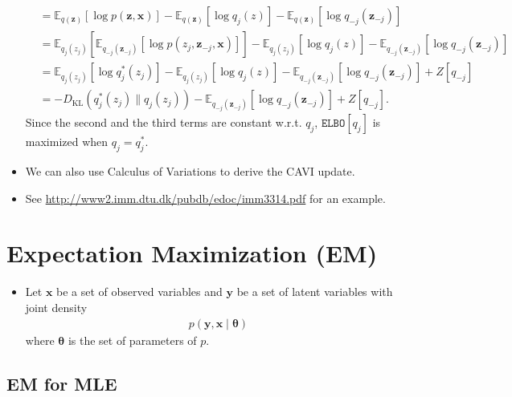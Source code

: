 \documentclass[10pt]{article}
\newcommand{\EE}{\mathbb{E}}
\newcommand{\elbo}{\texttt{ELBO}}
\newcommand{\KL}{D_{\text{KL}}}
\begin{document}
\begin{itemize}
\begin{align*}
&= \EE_{q(\bm{z})} [ \log p(\bm{z},\bm{x}) ] - \EE_{q(\bm{z})} [\log q_j(z)] - \EE_{q(\bm{z})} [\log q_{-j}(\bm{z}_{-j})] \\
&= \EE_{q_j(z_j)} \left[ \EE_{q_{-j}(\bm{z}_{-j})} [ \log p(z_j, \bm{z}_{-j}, \bm{x}) ] \right] - \EE_{q_j(z_j)} [\log q_j(z)] - \EE_{q_{-j}(\bm{z}_{-j})} [\log q_{-j}(\bm{z}_{-j})] \\
&= \EE_{q_j(z_j)} \left[ \log q^*_j(z_j) \right] - \EE_{q_j(z_j)} [\log q_j(z)] - \EE_{q_{-j}(\bm{z}_{-j})} [\log q_{-j}(\bm{z}_{-j})] + Z[q_{-j}] \\
&= -\KL(q^*_j(z_j) \| q_j(z_j)) - \EE_{q_{-j}(\bm{z}_{-j})} [\log q_{-j}(\bm{z}_{-j})] + Z[q_{-j}].
\end{align*}
Since the second and the third terms are constant w.r.t. $q_j$, $\elbo[q_j]$ is maximized when $q_j = q^*_j$.
\item We can also use Calculus of Variations to derive the CAVI update.
\item See \url{http://www2.imm.dtu.dk/pubdb/edoc/imm3314.pdf} for an example.
\end{itemize}

\section{Expectation Maximization (EM)}

\begin{itemize}
\item Let $\bm{x}$ be a set of observed variables and $\bm{y}$ be a set of latent variables with joint density
\begin{align*}
p(\bm{y},\bm{x} \mid \bm{\theta})
\end{align*}
where $\bm{\theta}$ is the set of parameters of $p$.
\end{itemize}

\subsection{EM for MLE}
\end{document}
